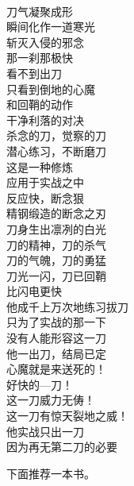 \begin{poem}[一刀流]
    \begin{multicols}{3}
        \centering~\\
        刀气凝聚成形 \\ 瞬间化作一道寒光 \\ 斩灭入侵的邪念 \\ 那一刹那极快 \\ 看不到出刀 \\ 只看到倒地的心魔 \\ 和回鞘的动作 \\ 干净利落的对决 \\ 杀念的刀，觉察的刀 \\ 潜心练习，不断磨刀 \\ 这是一种修炼 \\ 应用于实战之中 \\ 反应快，断念狠 \\ 精钢缎造的断念之刃 \\ 刀身生出凛冽的白光 \\ 刀的精神，刀的杀气 \\ 刀的气魄，刀的勇猛 \\ 刀光一闪，刀已回鞘 \\ 比闪电更快 \\ 他成千上万次地练习拔刀 \\ 只为了实战的那一下 \\ 没有人能形容这一刀 \\ 他一出刀，结局已定 \\ 心魔就是来送死的！ \\ 好快的—刀！ \\ 这一刀威力无俦！ \\ 这一刀有惊天裂地之威！ \\ 他实战只出一刀 \\ 因为再无第二刀的必要
    \end{multicols}
\end{poem}

下面推荐一本书。

